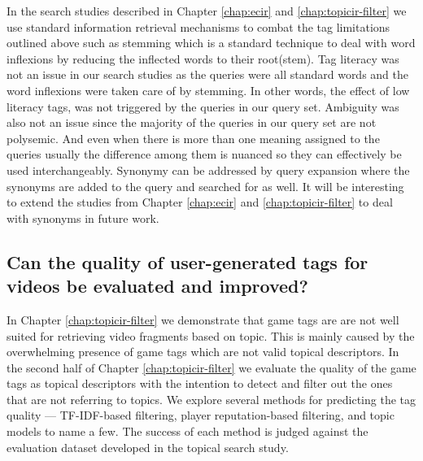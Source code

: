 In the search studies described in Chapter \ref{chap:ecir} and \ref{chap:topicir-filter} we use standard information retrieval mechanisms to combat the tag limitations outlined above such as stemming which is a standard technique to deal with word inflexions by reducing the inflected words to their root(stem). Tag literacy was not an issue in our search studies as the queries were all standard words and the word inflexions were taken care of by stemming. In other words, the effect of low literacy tags, was not triggered by the queries in our query set. Ambiguity was also not an issue since the majority of the queries in our query set are not polysemic. And even when there is more than one meaning assigned to the queries usually the difference among them is nuanced so they can effectively be used interchangeably. Synonymy can be addressed by query expansion where the synonyms are added to the query and searched for as well. It will be interesting to extend the studies from Chapter \ref{chap:ecir} and \ref{chap:topicir-filter} to deal with synonyms in future work.

\subsection{Can the quality of user-generated tags for videos be evaluated and improved?}\label{conclusion:filter}
In Chapter \ref{chap:topicir-filter} we demonstrate that game tags are are not well suited for retrieving video fragments based on topic. This is mainly caused by the overwhelming presence of game tags which are not valid topical descriptors. In the second half of Chapter \ref{chap:topicir-filter} we evaluate the quality of the game tags as topical descriptors with the intention to detect and filter out the ones that are not referring to topics. We explore several methods for predicting the tag quality --- TF-IDF-based filtering, player reputation-based filtering, and topic models to name a few. The success of each method is judged against the evaluation dataset developed in the topical search study.

